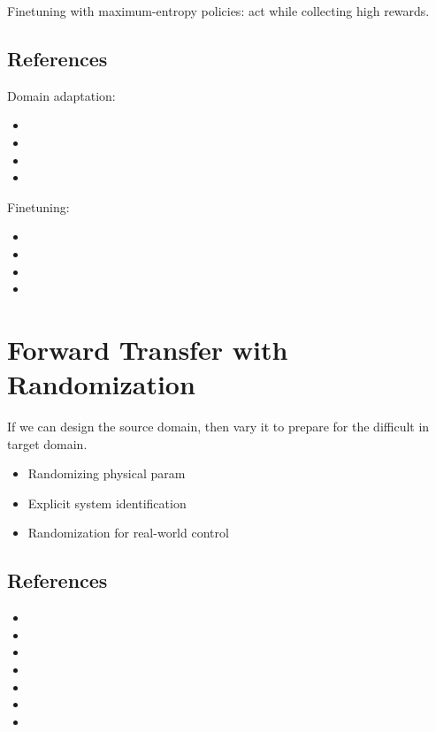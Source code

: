 Finetuning with maximum-entropy policies: act  while collecting high rewards. \cite{haarnoja2017reinforcement}

\subsection{References}
Domain adaptation:
\begin{itemize}
	\item {}
	\item {}
	\item {}
	\item {}
\end{itemize}

Finetuning:
\begin{itemize}
	\item {}
	\item {}
	\item {}
	\item {}
\end{itemize}

\section{Forward Transfer with Randomization}
 If we can design the source domain, then vary it to prepare for the difficult in target domain.

\begin{itemize}
	\item Randomizing physical \ac{param} \cite{rajeswaran2016epopt}
	\item Explicit system identification \cite{yu2017preparing}
	\item Randomization for real-world control \cite{sadeghi2016cad2rl}
\end{itemize}

\subsection{References}
\begin{itemize}
	\item {}
	\item {}
	\item {}
	\item {}
	\item {}
	\item {}
	\item {}
\end{itemize}

